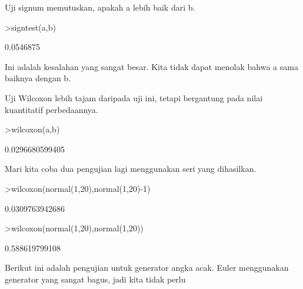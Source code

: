 \documentclass[a4paper,10pt]{article}
\begin{document}
\begin{eulernotebook}
\begin{eulercomment}
\begin{eulercomment}
\begin{eulercomment}
\begin{eulercomment}
\begin{eulercomment}
\begin{eulercomment}
\begin{eulercomment}
\begin{eulercomment}
\begin{eulercomment}
\begin{eulercomment}
\begin{eulercomment}
\begin{eulercomment}
\begin{eulercomment}
\begin{eulercomment}
\begin{eulercomment}
\begin{eulercomment}
\begin{eulercomment}
\begin{eulercomment}
\begin{eulercomment}
\begin{eulercomment}
\begin{eulercomment}
\begin{eulercomment}
\begin{eulercomment}
\begin{eulercomment}
\begin{eulercomment}
\begin{eulercomment}
\begin{eulercomment}
\begin{eulercomment}
\begin{eulercomment}
\begin{eulercomment}
\begin{eulercomment}
\begin{eulercomment}
\begin{eulercomment}
Uji signum memutuskan, apakah a lebih baik dari b.
\end{eulercomment}
\begin{eulerprompt}
>signtest(a,b)
\end{eulerprompt}
\begin{euleroutput}
  0.0546875
\end{euleroutput}
\begin{eulercomment}
Ini adalah kesalahan yang sangat besar. Kita tidak dapat menolak bahwa
a sama baiknya dengan b.

Uji Wilcoxon lebih tajam daripada uji ini, tetapi bergantung pada
nilai kuantitatif perbedaannya.
\end{eulercomment}
\begin{eulerprompt}
>wilcoxon(a,b)
\end{eulerprompt}
\begin{euleroutput}
  0.0296680599405
\end{euleroutput}
\begin{eulercomment}
Mari kita coba dua pengujian lagi menggunakan seri yang dihasilkan.
\end{eulercomment}
\begin{eulerprompt}
>wilcoxon(normal(1,20),normal(1,20)-1)
\end{eulerprompt}
\begin{euleroutput}
  0.0309763942686
\end{euleroutput}
\begin{eulerprompt}
>wilcoxon(normal(1,20),normal(1,20))
\end{eulerprompt}
\begin{euleroutput}
  0.588619799108
\end{euleroutput}
\begin{eulercomment}
Berikut ini adalah pengujian untuk generator angka acak. Euler
menggunakan generator yang sangat bagus, jadi kita tidak perlu

\end{eulercomment}
\end{eulercomment}
\end{eulercomment}
\end{eulercomment}
\end{eulercomment}
\end{eulercomment}
\end{eulercomment}
\end{eulercomment}
\end{eulercomment}
\end{eulercomment}
\end{eulercomment}
\end{eulercomment}
\end{eulercomment}
\end{eulercomment}
\end{eulercomment}
\end{eulercomment}
\end{eulercomment}
\end{eulercomment}
\end{eulercomment}
\end{eulercomment}
\end{eulercomment}
\end{eulercomment}
\end{eulercomment}
\end{eulercomment}
\end{eulercomment}
\end{eulercomment}
\end{eulercomment}
\end{eulercomment}
\end{eulercomment}
\end{eulercomment}
\end{eulercomment}
\end{eulercomment}
\end{eulercomment}
\end{eulernotebook}
\end{document}
